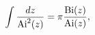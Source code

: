\[\int\frac{dz}{{\mathop{\mathrm{Ai}\/}\nolimits^{2}}\!\left(z\right)}=\pi\frac{%
\mathop{\mathrm{Bi}\/}\nolimits\!\left(z\right)}{\mathop{\mathrm{Ai}\/}%
\nolimits\!\left(z\right)},\]